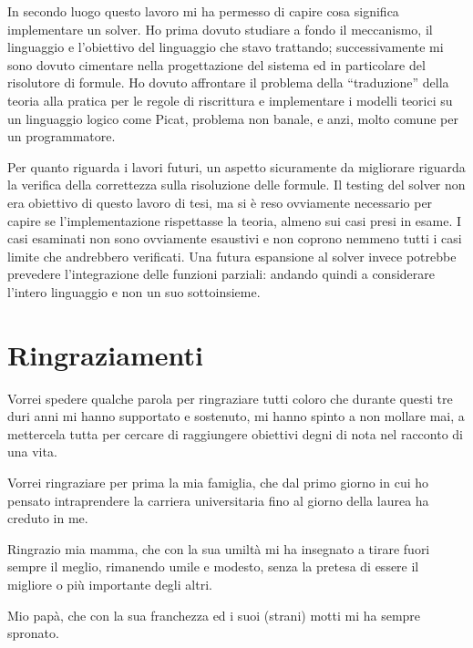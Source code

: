\documentclass[12pt,a4paper,openright]{book} %
\begin{document}
In secondo luogo questo lavoro mi ha permesso di capire cosa significa
implementare un solver. Ho prima dovuto studiare a fondo il
meccanismo, il linguaggio e l'obiettivo del linguaggio che stavo
trattando; successivamente mi sono dovuto cimentare nella
progettazione del sistema ed in particolare del risolutore di
formule. Ho dovuto affrontare il problema della ``traduzione'' della
teoria alla pratica per le regole di riscrittura e implementare i
modelli teorici su un linguaggio logico come Picat, problema non
banale, e anzi, molto comune per un programmatore.

Per quanto riguarda i lavori futuri, un aspetto sicuramente da
migliorare riguarda la verifica della correttezza sulla risoluzione
delle formule. Il testing del solver non era obiettivo di questo
lavoro di tesi, ma si è reso ovviamente necessario per capire se
l'implementazione rispettasse la teoria, almeno sui casi presi in
esame. I casi esaminati non sono ovviamente esaustivi e non coprono
nemmeno tutti i casi limite che andrebbero verificati. Una futura
espansione al solver invece potrebbe prevedere l'integrazione delle
funzioni parziali: andando quindi a considerare l'intero linguaggio
\lset{} e non un suo sottoinsieme.



\chapter*{Ringraziamenti}

Vorrei spedere qualche parola per ringraziare tutti coloro che durante
questi tre duri anni mi hanno supportato e sostenuto, mi hanno spinto
a non mollare mai, a mettercela tutta per cercare di raggiungere
obiettivi degni di nota nel racconto di una vita.

\bigskip

Vorrei ringraziare per prima la mia famiglia, che dal primo giorno in
cui ho pensato intraprendere la carriera universitaria fino al giorno
della laurea ha creduto in me.

Ringrazio mia mamma, che con la sua umiltà mi ha insegnato a tirare
fuori sempre il meglio, rimanendo umile e modesto, senza la pretesa di
essere il migliore o più importante degli altri.

Mio papà, che con la sua franchezza ed i suoi (strani) motti mi ha
sempre spronato.
\end{document}
